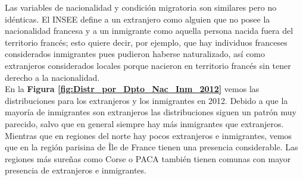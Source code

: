 Las variables de nacionalidad y condición migratoria son similares pero no idénticas. El INSEE define a un extranjero como alguien que no posee la nacionalidad francesa y a un inmigrante como aquella persona nacida fuera del territorio francés; esto quiere decir, por ejemplo, que hay individuos franceses considerados inmigrantes pues pudieron haberse naturalizado, así como extranjeros considerados locales porque nacieron en territorio francés sin tener derecho a la nacionalidad.\\ 

En la \textbf{Figura \ref{fig:Distr_por_Dpto_Nac_Inm_2012}} vemos las distribuciones para los extranjeros y los inmigrantes en 2012. Debido a que la mayoría de inmigrantes son extranjeros las distribuciones siguen un patrón muy parecido, salvo que en general siempre hay más inmigrantes que extranjeros. Mientras que en regiones del norte hay pocos extranjeros e inmigrantes, vemos que en la región parisina de Île de France tienen una presencia considerable. Las regiones más sureñas como Corse o PACA también tienen comunas con mayor presencia de extranjeros e inmigrantes.\\

